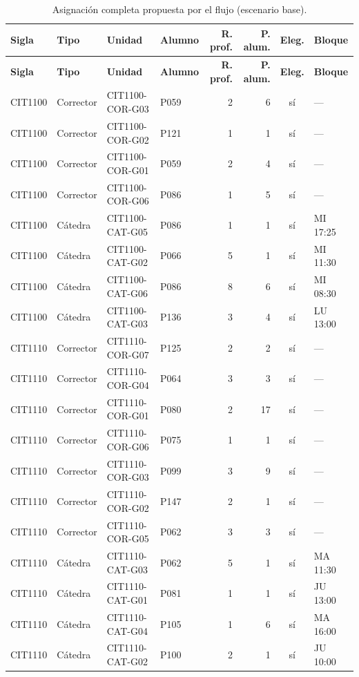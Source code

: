 \begin{longtable}{llllrrcl}
\caption{Asignación completa propuesta por el flujo (escenario base).}\label{tab:anexo}\\
\toprule
\textbf{Sigla} & \textbf{Tipo} & \textbf{Unidad} & \textbf{Alumno} & \textbf{R. prof.} & \textbf{P. alum.} & \textbf{Eleg.} & \textbf{Bloque} \\
\midrule
\endfirsthead
\toprule
\textbf{Sigla} & \textbf{Tipo} & \textbf{Unidad} & \textbf{Alumno} & \textbf{R. prof.} & \textbf{P. alum.} & \textbf{Eleg.} & \textbf{Bloque} \\
\midrule
\endhead
\bottomrule
\endfoot
CIT1100 & Corrector & CIT1100-COR-G03 & P059 & 2 & 6 & sí & — \\
CIT1100 & Corrector & CIT1100-COR-G02 & P121 & 1 & 1 & sí & — \\
CIT1100 & Corrector & CIT1100-COR-G01 & P059 & 2 & 4 & sí & — \\
CIT1100 & Corrector & CIT1100-COR-G06 & P086 & 1 & 5 & sí & — \\
CIT1100 & Cátedra & CIT1100-CAT-G05 & P086 & 1 & 1 & sí & MI 17:25 \\
CIT1100 & Cátedra & CIT1100-CAT-G02 & P066 & 5 & 1 & sí & MI 11:30 \\
CIT1100 & Cátedra & CIT1100-CAT-G06 & P086 & 8 & 6 & sí & MI 08:30 \\
CIT1100 & Cátedra & CIT1100-CAT-G03 & P136 & 3 & 4 & sí & LU 13:00 \\
CIT1110 & Corrector & CIT1110-COR-G07 & P125 & 2 & 2 & sí & — \\
CIT1110 & Corrector & CIT1110-COR-G04 & P064 & 3 & 3 & sí & — \\
CIT1110 & Corrector & CIT1110-COR-G01 & P080 & 2 & 17 & sí & — \\
CIT1110 & Corrector & CIT1110-COR-G06 & P075 & 1 & 1 & sí & — \\
CIT1110 & Corrector & CIT1110-COR-G03 & P099 & 3 & 9 & sí & — \\
CIT1110 & Corrector & CIT1110-COR-G02 & P147 & 2 & 1 & sí & — \\
CIT1110 & Corrector & CIT1110-COR-G05 & P062 & 3 & 3 & sí & — \\
CIT1110 & Cátedra & CIT1110-CAT-G03 & P062 & 5 & 1 & sí & MA 11:30 \\
CIT1110 & Cátedra & CIT1110-CAT-G01 & P081 & 1 & 1 & sí & JU 13:00 \\
CIT1110 & Cátedra & CIT1110-CAT-G04 & P105 & 1 & 6 & sí & MA 16:00 \\
CIT1110 & Cátedra & CIT1110-CAT-G02 & P100 & 2 & 1 & sí & JU 10:00 \\

\end{longtable}
